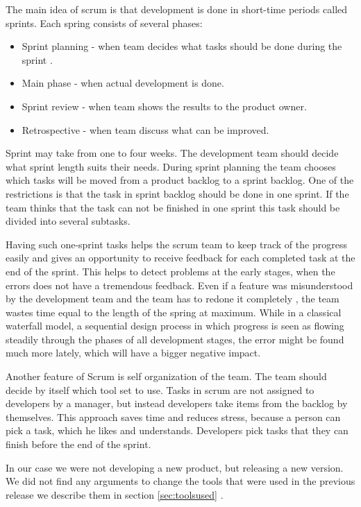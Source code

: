   The main idea of scrum is that development is done in short-time periods
  called sprints. Each spring consists of several phases:
  \begin{itemize}
    \item  Sprint planning - when team decides what tasks should be done during the
  sprint .
  \item   Main phase - when actual development is done.
  \item Sprint review - when team shows the results to the product owner.
  \item Retrospective - when team discuss what can be improved.
  \end{itemize}
 
  Sprint may take from one to four weeks. The development team should decide
  what sprint length suits their needs. During sprint planning the team chooses
  which tasks will be moved from a product backlog to a sprint backlog.
  One of the restrictions is that the task in sprint backlog should be done in one sprint.
  If the team thinks that the task can not be finished in one sprint this task
  should be divided into several subtasks. 
  
  Having such one-sprint tasks helps the scrum team to keep track of the
  progress easily and gives an opportunity to receive feedback for each
  completed task at the end of the sprint. This helps to detect problems at the early stages, when
  the errors does not have a tremendous feedback.
  Even if a feature was misunderstood by the development team
  and the team  has to redone it completely , the team wastes time equal to the
  length of the spring at maximum. While in a classical waterfall model,
   a sequential design process in which progress is seen as flowing steadily through 
   the phases of all development stages, 
  the error might be found much more lately, which will have a bigger negative impact.

  Another feature of Scrum is self organization of the team. The team should
  decide by itself which tool set to use. Tasks in scrum are not assigned to
  developers by a manager, but instead developers take items from the backlog by themselves.
  This approach saves time and reduces stress, because a person can pick a task,
  which he likes and understands. Developers pick tasks that they
  can finish before the end of the sprint.

  In our case we were not developing a new product, but releasing a new version.
  We did not find any arguments to change the tools that were used in the
  previous release we describe them in section \ref{sec:toolsused} .

